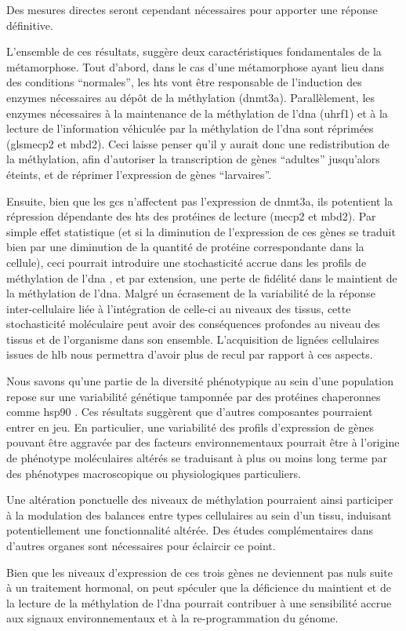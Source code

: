 \documentclass[../main.tex]{subfiles}
\begin{document}
Des mesures directes seront cependant nécessaires pour apporter une réponse définitive.
\par
L'ensemble de ces résultats, suggère deux caractéristiques fondamentales de la métamorphose.
Tout d'abord, dans le cas d'une métamorphose ayant lieu dans des conditions ``normales'', les \glspl{ht} vont être responsable de l'induction des enzymes nécessaires au dépôt de la méthylation (\gls{dnmt3a}).
Parallèlement, les enzymes nécessaires à la maintenance de la méthylation de l'\gls{dna} (\gls{uhrf1}) et à la lecture de l'information véhiculée par la méthylation de l'\gls{dna} sont réprimées (gls{mecp2} et \gls{mbd}2).
Ceci laisse penser qu'il y aurait donc une redistribution de la méthylation, afin d’autoriser la transcription de gènes ``adultes'' jusqu'alors éteints, et de réprimer l'expression de gènes ``larvaires''.
\par
Ensuite, bien que les \glspl{gc} n'affectent pas l'expression de \gls{dnmt3a}, ils potentient la répression dépendante des \glspl{ht} des protéines de lecture (\gls{mecp2} et \gls{mbd}2).
Par simple effet statistique (et si la diminution de l'expression de ces gènes se traduit bien par une diminution de la quantité de protéine correspondante dans la cellule), ceci pourrait introduire une stochasticité accrue dans les profils de méthylation de l'\gls{dna} \citep{Xie2011,Landan2012}, et par extension, une perte de fidélité dans le maintient de la méthylation de l'\gls{dna}.
Malgré un écrasement de la variabilité de la réponse inter-cellulaire liée à l'intégration de celle-ci au niveaux des tissus, cette stochasticité moléculaire peut avoir des conséquences profondes au niveau des tissus et de l'organisme dans son ensemble.
L'acquisition de lignées cellulaires issues de \gls{hlb} \citep{Sinzelle2012} nous permettra d'avoir plus de recul par rapport à ces aspects.
\par
{}
Nous savons qu'une partie de la diversité phénotypique au sein d'une population repose sur une variabilité génétique tamponnée par des protéines chaperonnes comme \gls{hsp90} \citep{Queitsch2002}.
Ces résultats suggèrent que d'autres composantes pourraient entrer en jeu.
En particulier, une variabilité des profils d’expression de gènes pouvant être aggravée par des facteurs environnementaux pourrait être à l'origine de phénotype moléculaires altérés se traduisant à plus ou moins long terme par des phénotypes macroscopique ou physiologiques particuliers.
\par
Une altération ponctuelle des niveaux de méthylation pourraient ainsi participer à la modulation des balances entre types cellulaires au sein d'un tissu, induisant potentiellement une fonctionnalité altérée.
Des études complémentaires dans d'autres organes sont nécessaires pour éclaircir ce point.
\par
Bien que les niveaux d'expression de ces trois gènes ne deviennent pas nuls suite à un traitement hormonal, on peut spéculer que la déficience du maintient et de la lecture de la méthylation de l'\gls{dna} pourrait contribuer à une sensibilité accrue aux signaux environnementaux et à la re-programmation du génome.
\end{document}
